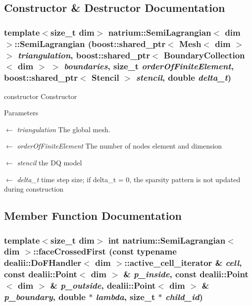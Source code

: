 \subsection{Constructor \& Destructor Documentation}
\hypertarget{classnatrium_1_1SemiLagrangian_ae6ef291c9cd0579ebb5889b271d64123}{
\subsubsection[{SemiLagrangian}]{\setlength{\rightskip}{0pt plus 5cm}template$<$size\_\-t dim$>$ {\bf natrium::SemiLagrangian}$<$ dim $>$::{\bf SemiLagrangian} (boost::shared\_\-ptr$<$ Mesh$<$ dim $>$ $>$ {\em triangulation}, \/  boost::shared\_\-ptr$<$ {\bf BoundaryCollection}$<$ dim $>$ $>$ {\em boundaries}, \/  size\_\-t {\em orderOfFiniteElement}, \/  boost::shared\_\-ptr$<$ {\bf Stencil} $>$ {\em stencil}, \/  double {\em delta\_\-t})}}
\label{classnatrium_1_1SemiLagrangian_ae6ef291c9cd0579ebb5889b271d64123}


constructor Constructor 
\begin{DoxyParams}{Parameters}
\item[\mbox{$\leftarrow$} {\em triangulation}]The global mesh. \item[\mbox{$\leftarrow$} {\em orderOfFiniteElement}]The number of nodes element and dimension \item[\mbox{$\leftarrow$} {\em stencil}]the DQ model \item[\mbox{$\leftarrow$} {\em delta\_\-t}]time step size; if delta\_\-t = 0, the sparsity pattern is not updated during construction \end{DoxyParams}


\subsection{Member Function Documentation}
\hypertarget{classnatrium_1_1SemiLagrangian_a3b096afb85f7ea3782e03ba36b973088}{
\subsubsection[{faceCrossedFirst}]{\setlength{\rightskip}{0pt plus 5cm}template$<$size\_\-t dim$>$ int {\bf natrium::SemiLagrangian}$<$ dim $>$::faceCrossedFirst (const typename dealii::DoFHandler$<$ dim $>$::active\_\-cell\_\-iterator \& {\em cell}, \/  const dealii::Point$<$ dim $>$ \& {\em p\_\-inside}, \/  const dealii::Point$<$ dim $>$ \& {\em p\_\-outside}, \/  dealii::Point$<$ dim $>$ \& {\em p\_\-boundary}, \/  double $\ast$ {\em lambda}, \/  size\_\-t $\ast$ {\em child\_\-id})}}
\label{classnatrium_1_1SemiLagrangian_a3b096afb85f7ea3782e03ba36b973088}


